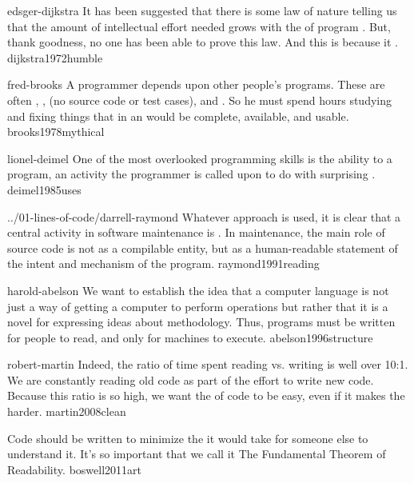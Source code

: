 \documentclass{article}
\begin{document}


\lnQuote
  {edsger-dijkstra}
  {It has been suggested that there is some law of nature telling us that the amount of intellectual effort needed grows with the  of program . But, thank goodness, no one has been able to prove this law. And this is because it .}
  {dijkstra1972humble}

\lnQuote
  {fred-brooks}
  {A programmer depends upon other people's programs. These are often , ,  (no source code or test cases), and . So he must spend hours studying and fixing things that in an  would be complete, available, and usable.}
  {brooks1978mythical}

\lnQuote
  {lionel-deimel}
  {One of the most overlooked programming skills is the ability to  a program, an activity the programmer is called upon to do with surprising .}
  {deimel1985uses}

\lnQuote
  {../01-lines-of-code/darrell-raymond}
  {Whatever approach is used, it is clear that a central activity in software maintenance is . In maintenance, the main role of source code is not as a compilable entity, but as a human-readable statement of the intent and mechanism of the program.}
  {raymond1991reading}

\lnQuote
  {harold-abelson}
  {We want to establish the idea that a computer language is not just a way of getting a computer to perform operations but rather that it is a novel  for expressing ideas about methodology. Thus, programs must be written for people to read, and only  for machines to execute.}
  {abelson1996structure}

\lnQuote
  {robert-martin}
  {Indeed, the ratio of time spent reading vs. writing is well over 10:1. We are constantly reading old code as part of the effort to write new code. Because this ratio is so high, we want the  of code to be easy, even if it makes the  harder.}
  {martin2008clean}

  {Code should be written to minimize the  it would take for someone else to understand it. It's so important that we call it The Fundamental Theorem of Readability.}
  {boswell2011art}
\end{document}
